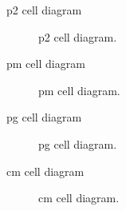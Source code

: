 \documentclass{beamer}
\theoremstyle{definition}
\begin{document}
\begin{frame}{p2 cell diagram}
    \begin{figure}
        \centering
        
        \caption{p2 cell diagram.}
        \label{fig:enter-label}
    \end{figure}
\end{frame}

\begin{frame}{pm cell diagram}
    \begin{figure}
        \centering
        
        \caption{pm cell diagram.}
        \label{fig:enter-label}
    \end{figure}
\end{frame}

\begin{frame}{pg cell diagram}
    \begin{figure}
        \centering
        
        \caption{pg cell diagram.}
        \label{fig:enter-label}
    \end{figure}
\end{frame}

\begin{frame}{cm cell diagram}
    \begin{figure}
        \centering
        
        \caption{cm cell diagram.}
        \label{fig:enter-label}
    \end{figure}
\end{frame}
\end{document}
